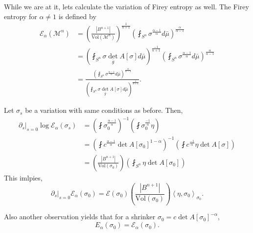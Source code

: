 \documentclass[12pt,a4paper]{article}
\begin{document}
While we are at it, lets calculate the variation of Firey entropy as well. The Firey entropy for $ \alpha \neq 1  $ is defined by 
\begin{align*}
   \mathcal{E}_{\alpha}(\mathcal{M}^{n}) & = \left( \frac{|B^{n+1}|}{\text{Vol}(\mathcal{M}^{n})} \right)^{ \frac{1}{n+1}} \left( \fint_{S^{n}}\sigma^{ \frac{\alpha-1}{\alpha}} d \bar{\mu}\right)^{\frac{\alpha}{\alpha-1}} \\
   & = \left( \fint_{S^{n}} \sigma \det_{\overline{g}} A[\sigma] d\bar{\mu}\right)^{\frac{-1}{n+1}} \left( \fint_{S^{n}}\sigma^{ \frac{\alpha-1}{\alpha}} d \bar{\mu}\right)^{\frac{\alpha}{\alpha-1}} \\
   & = \frac{\left( \fint_{S^{n}}\sigma^{ \frac{\alpha-1}{\alpha}} d \bar{\mu}\right)^{\frac{\alpha}{\alpha-1}}}{\left( \fint_{S^{n}} \sigma \det_{\overline{g}} A[\sigma] d\bar{\mu}\right)^{\frac{1}{n+1}}}.
\end{align*}

Let $ \sigma_{s} $ be a variation with same conditions as before. Then, 
\begin{align*}
   \partial_{s}\big|_{s=0}\log \mathcal{E}_{\alpha}(\sigma_{s}) & = \left( \fint \sigma_{0}^{ \frac{\alpha-1}{\alpha}} \right)^{-1} \left(  \fint \sigma_{0}^{ \frac{-1}{\alpha}}\eta \right) \\
   & = \left( \fint  c^{ \frac{ \alpha-1}{\alpha}} \det A[\sigma_{0}]^{1-\alpha} \right)^{-1} \left( \fint c^{ \frac{-1}{\alpha}}  \eta \det A[\sigma] \right) \\
   & = \left( \frac{|B^{n+1}|}{\text{Vol}(\sigma_{0})} \right) \left(\fint_{S^{n}} \eta \det A[\sigma_{0}] \right)
\end{align*}
This imlpies, 
\[ \partial_{s}\big|_{s=0} \mathcal{E}_{\alpha}(\sigma_{0}) = \mathcal{E}(\sigma_{0}) \left( \frac{|B^{n+1}|}{\text{Vol}(\sigma_{0})} \right)\left< \eta, \sigma_{0} \right>_{\sigma_{0}}. \]

Also another observation yields that for a shrinker $ \sigma_{0} = c \det A[\sigma_{0}]^{-\alpha} $, 
\[ E_{\alpha}(\sigma_{0}) = \mathcal{E}_{\alpha}(\sigma_{0}). \]
\end{document}
